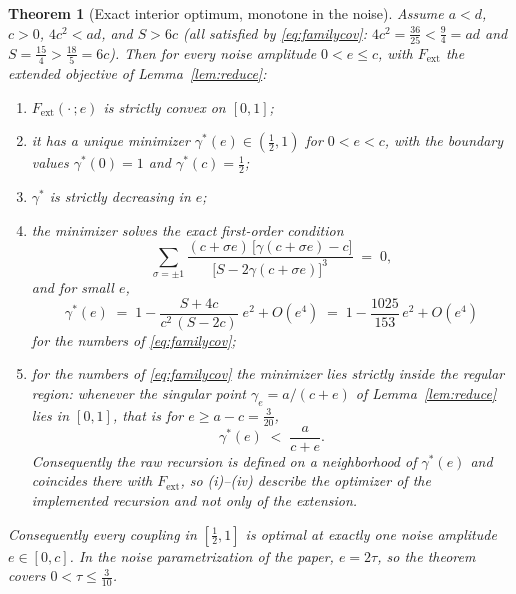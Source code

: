 \documentclass[11pt]{article}
\newtheorem{theorem}{Theorem}
\theoremstyle{remark}
\begin{document}
\begin{theorem}[Exact interior optimum, monotone in the noise]
\label{thm:family}
Assume $a < d$, $c > 0$, $4c^2 < ad$, and $S > 6c$ (all satisfied by
\eqref{eq:familycov}: $4c^2 = \tfrac{36}{25} < \tfrac94 = ad$ and
$S = \tfrac{15}{4} > \tfrac{18}{5} = 6c$). Then for every noise amplitude
$0 < e \le c$, with $F_{\mathrm{ext}}$ the extended objective of
Lemma~\ref{lem:reduce}:
\begin{enumerate}
\item[\textup{(i)}] $F_{\mathrm{ext}}(\cdot\,; e)$ is strictly convex on
  $[0, 1]$;
\item[\textup{(ii)}] it has a unique minimizer $\gamma^*(e) \in
  (\tfrac12, 1)$ for $0 < e < c$, with the boundary values
  $\gamma^*(0) = 1$ and $\gamma^*(c) = \tfrac12$;
\item[\textup{(iii)}] $\gamma^*$ is strictly decreasing in $e$;
\item[\textup{(iv)}] the minimizer solves the exact first-order condition
\begin{equation}
  \sum_{\sigma = \pm 1}
  \frac{(c + \sigma e)\,\big[\gamma(c + \sigma e) - c\big]}
       {\big[S - 2\gamma(c + \sigma e)\big]^{3}} \;=\; 0,
  \label{eq:foc}
\end{equation}
and for small $e$,
\begin{equation}
  \gamma^*(e) \;=\; 1 - \frac{S + 4c}{c^2\,(S - 2c)}\; e^2 + O(e^4)
  \;=\; 1 - \frac{1025}{153}\, e^2 + O(e^4)
  \label{eq:smalle}
\end{equation}
for the numbers of \eqref{eq:familycov};
\item[\textup{(v)}] for the numbers of \eqref{eq:familycov} the minimizer
  lies strictly inside the regular region: whenever the singular point
  $\gamma_e = a/(c+e)$ of Lemma~\ref{lem:reduce} lies in $[0,1]$, that is
  for $e \ge a - c = \tfrac{3}{20}$,
\[
  \gamma^*(e) \;<\; \frac{a}{c + e}.
\]
Consequently the raw recursion is defined on a neighborhood of
$\gamma^*(e)$ and coincides there with $F_{\mathrm{ext}}$, so
(i)--(iv) describe the optimizer of the implemented recursion and not only
of the extension.
\end{enumerate}
Consequently every coupling in $[\tfrac12, 1]$ is optimal at exactly one
noise amplitude $e \in [0, c]$. In the noise parametrization of the paper,
$e = 2\tau$, so the theorem covers $0 < \tau \le \tfrac{3}{10}$.
\end{theorem}
\end{document}
